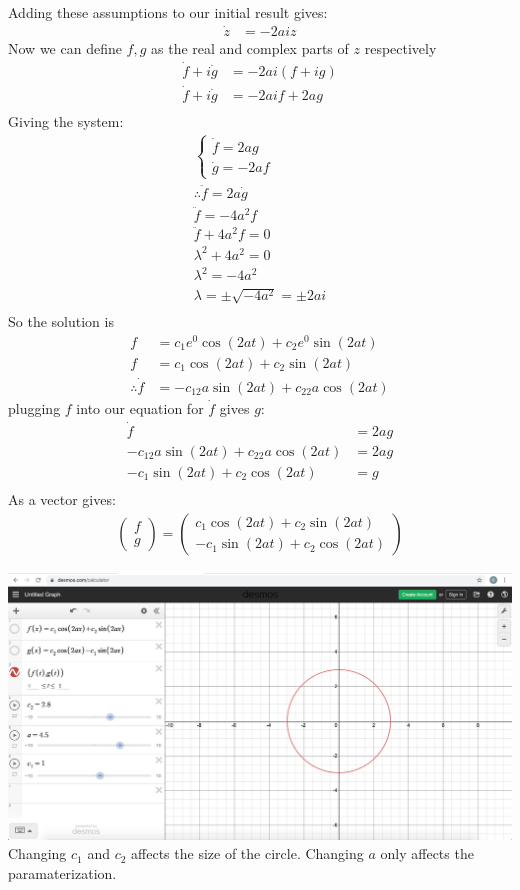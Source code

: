 \documentclass[10pt]{article}
\begin{document}
Adding these assumptions to our initial result gives:
\begin{align*}
\dot z&=-2aiz
\end{align*}
Now we can define $f,g$ as the real and complex parts of $z$ respectively
\begin{align*}
\dot f+i\dot g&=-2ai(f+ig)\\
\dot f+i\dot g&=-2aif+2ag\\
\end{align*}
Giving the system:
\begin{align*}
\begin{cases}\dot f=2ag\\\dot g=-2af\end{cases}\\
\therefore \ddot f=2a\dot g\\
\ddot f=-4a^2f\\
\ddot f+4a^2f=0\\
\lambda^2+4a^2=0\\
\lambda^2=-4a^2\\
\lambda = \pm\sqrt{-4a^2} = \pm2ai\\
\end{align*}
So the solution is
\begin{align*}
f&=c_1e^0\cos(2at)+c_2e^0\sin(2at)\\
f&=c_1\cos(2at)+c_2\sin(2at)\\
\therefore \dot f&=-c_12a\sin(2at)+c_22a\cos(2at)
\end{align*}
plugging $f$ into our equation for $\dot f$ gives $g$: 
\begin{align*}
\dot f&=2ag\\
-c_12a\sin(2at)+c_22a\cos(2at)&=2ag\\
-c_1\sin(2at)+c_2\cos(2at)&=g\\
\end{align*}
As a vector gives:
\begin{align*}
\begin{pmatrix}f\\g\end{pmatrix}=
\begin{pmatrix}c_1\cos(2at)+c_2\sin(2at)\\-c_1\sin(2at)+c_2\cos(2at)\end{pmatrix}
\end{align*}

\includegraphics[width=\textwidth]{Figure1}
Changing $c_1$ and $c_2$ affects the size of the circle.
Changing $a$ only affects the paramaterization.
\end{document}

